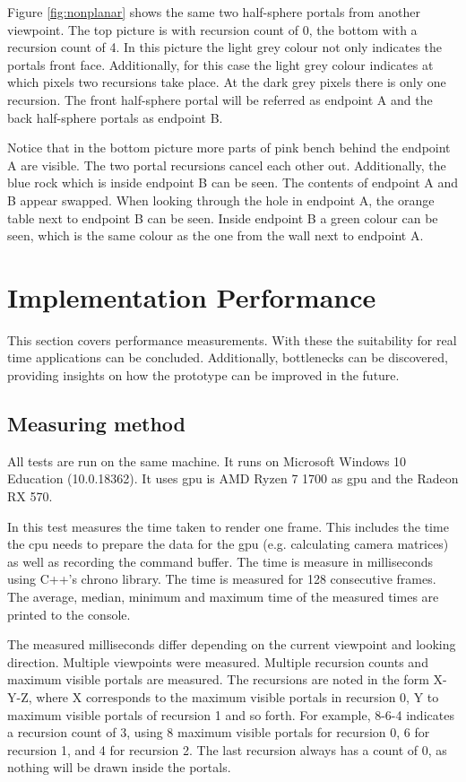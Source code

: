 Figure \ref{fig:nonplanar} shows the same two half-sphere portals from another viewpoint. The top picture is with recursion count of 0, the bottom with a recursion count of 4. In this picture the light grey colour not only indicates the portals front face. Additionally, for this case the light grey colour indicates at which pixels two recursions take place. At the dark grey pixels there is only one recursion. The front half-sphere portal will be referred as \gls{endpoint} A and the back half-sphere portals as \gls{endpoint} B.

Notice that in the bottom picture more parts of pink bench behind the \gls{endpoint} A are visible. The two portal recursions cancel each other out. Additionally, the blue rock which is inside \gls{endpoint} B can be seen. The contents of \gls{endpoint} A and B appear swapped. When looking through the hole in \gls{endpoint} A, the orange table next to \gls{endpoint} B can be seen. Inside \gls{endpoint} B a green colour can be seen, which is the same colour as the one from the wall next to \gls{endpoint} A.

\section{Implementation Performance}
\label{section:performancemeasurement}

This section covers performance measurements. With these the suitability for real time applications can be concluded. Additionally, bottlenecks can be discovered, providing insights on how the prototype can be improved in the future.

\subsection{Measuring method}
All tests are run on the same machine. It runs on Microsoft Windows 10 Education (10.0.18362). It uses \gls{gpu} is AMD Ryzen 7 1700 as \gls{gpu} and the Radeon RX 570.

In this test measures the time taken to render one frame. This includes the time the \gls{cpu} needs to prepare the data for the \gls{gpu} (e.g. calculating camera matrices) as well as recording the command buffer. The time is measure in milliseconds using C++'s chrono library. The time is measured for 128 consecutive frames. The average, median, minimum and maximum time of the measured times are printed to the console.


The measured milliseconds differ depending on the current viewpoint and looking direction. Multiple viewpoints were measured. Multiple recursion counts and maximum visible portals are measured. The recursions are noted in the form X-Y-Z, where X corresponds to the maximum visible portals in recursion 0, Y to maximum visible portals of recursion 1 and so forth. For example, 8-6-4 indicates a recursion count of 3, using 8 maximum visible portals for recursion 0, 6 for recursion 1, and 4 for recursion 2. The last recursion always has a count of 0, as nothing will be drawn inside the portals. 

